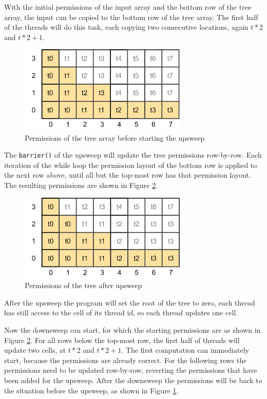 \documentclass[a4paper]{article}
\newcommand{\code}[1]{\texttt{\small \color{inline}#1}} %
\begin{document}
With the initial permissions of the input array and the bottom row of the tree array, the input can be copied to the bottom row of the tree array. The first half of the threads will do this task, each copying two consecutive locations, again $t*2$ and $t*2+1$.

\begin{figure}[htb!]
	\centering
	\includegraphics[width=80mm]{../images/tree-permissions-start-v1.png}
	\caption{Permissions of the tree array before starting the upsweep}
	\label{fig:treeArrayPermissionsStart}
\end{figure}
\FloatBarrier

The \code{barrier()} of the upsweep will update the tree permissions row-by-row. Each iteration of the while loop the permission layout of the bottom row is applied to the next row above, until all but the top-most row has that permission layout. The resulting permissions are shown in Figure \ref{fig:treeArrayPermissionsMiddle}.

\begin{figure}[htb!]
	\centering
	\includegraphics[width=80mm]{../images/tree-permissions-middle-v1.png}
	\caption{Permissions of the tree after upsweep}
	\label{fig:treeArrayPermissionsMiddle}
\end{figure}
\FloatBarrier

After the upsweep the program will set the root of the tree to zero, each thread has still access to the cell of its thread id, so each thread updates one cell.

Now the downsweep can start, for which the starting permissions are as shown in Figure \ref{fig:treeArrayPermissionsMiddle}. For all rows below the top-most row, the first half of threads will update two cells, at $t*2$ and $t*2+1$. The first computation can immediately start, because the permissions are already correct. For the following rows the permissions need to be updated row-by-row, reverting the permissions that have been added for the upsweep. After the downsweep the permissions will be back to the situation before the upsweep, as shown in Figure \ref{fig:treeArrayPermissionsStart}.
\end{document}

